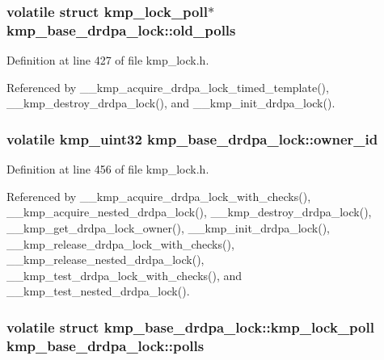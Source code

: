 \hypertarget{structkmp__base__drdpa__lock_a1debd4e500c7c07e8943125d5d230555}{
\subsubsection[{old\-\_\-polls}]{\setlength{\rightskip}{0pt plus 5cm}volatile struct {\bf kmp\-\_\-lock\-\_\-poll}$\ast$ kmp\-\_\-base\-\_\-drdpa\-\_\-lock\-::old\-\_\-polls}}\label{structkmp__base__drdpa__lock_a1debd4e500c7c07e8943125d5d230555}


Definition at line 427 of file kmp\-\_\-lock.\-h.



Referenced by \-\_\-\-\_\-kmp\-\_\-acquire\-\_\-drdpa\-\_\-lock\-\_\-timed\-\_\-template(), \-\_\-\-\_\-kmp\-\_\-destroy\-\_\-drdpa\-\_\-lock(), and \-\_\-\-\_\-kmp\-\_\-init\-\_\-drdpa\-\_\-lock().

\hypertarget{structkmp__base__drdpa__lock_a941e91e161836331e4107e447c360fea}{
\subsubsection[{owner\-\_\-id}]{\setlength{\rightskip}{0pt plus 5cm}volatile kmp\-\_\-uint32 kmp\-\_\-base\-\_\-drdpa\-\_\-lock\-::owner\-\_\-id}}\label{structkmp__base__drdpa__lock_a941e91e161836331e4107e447c360fea}


Definition at line 456 of file kmp\-\_\-lock.\-h.



Referenced by \-\_\-\-\_\-kmp\-\_\-acquire\-\_\-drdpa\-\_\-lock\-\_\-with\-\_\-checks(), \-\_\-\-\_\-kmp\-\_\-acquire\-\_\-nested\-\_\-drdpa\-\_\-lock(), \-\_\-\-\_\-kmp\-\_\-destroy\-\_\-drdpa\-\_\-lock(), \-\_\-\-\_\-kmp\-\_\-get\-\_\-drdpa\-\_\-lock\-\_\-owner(), \-\_\-\-\_\-kmp\-\_\-init\-\_\-drdpa\-\_\-lock(), \-\_\-\-\_\-kmp\-\_\-release\-\_\-drdpa\-\_\-lock\-\_\-with\-\_\-checks(), \-\_\-\-\_\-kmp\-\_\-release\-\_\-nested\-\_\-drdpa\-\_\-lock(), \-\_\-\-\_\-kmp\-\_\-test\-\_\-drdpa\-\_\-lock\-\_\-with\-\_\-checks(), and \-\_\-\-\_\-kmp\-\_\-test\-\_\-nested\-\_\-drdpa\-\_\-lock().

\hypertarget{structkmp__base__drdpa__lock_a593b095d74a879395f66298a78b97f44}{
\subsubsection[{polls}]{\setlength{\rightskip}{0pt plus 5cm}volatile struct {\bf kmp\-\_\-base\-\_\-drdpa\-\_\-lock\-::kmp\-\_\-lock\-\_\-poll} kmp\-\_\-base\-\_\-drdpa\-\_\-lock\-::polls}}\label{structkmp__base__drdpa__lock_a593b095d74a879395f66298a78b97f44}


